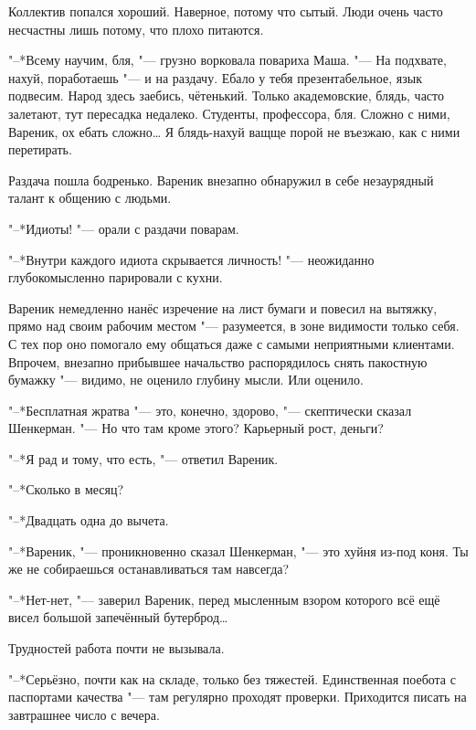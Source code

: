 \asterism

\label{Fri_2012_04_27}

Коллектив попался хороший.
Наверное, потому что сытый.
Люди очень часто несчастны лишь потому, что плохо питаются.

"--*Всему научим, бля, "--- грузно ворковала повариха Маша.
"--- На подхвате, нахуй, поработаешь "--- и на раздачу.
Ебало у тебя презентабельное, язык подвесим.
Народ здесь заебись, чётенький.
Только академовские, блядь, часто залетают, тут пересадка недалеко.
Студенты, профессора, бля.
Сложно с ними, Вареник, ох ебать сложно\dots{}
Я блядь-нахуй ващще порой не въезжаю, как с ними перетирать.

Раздача пошла бодренько.
Вареник внезапно обнаружил в себе незаурядный талант к общению с людьми.

"--*Идиоты! "--- орали с раздачи поварам.

"--*Внутри каждого идиота скрывается личность! "--- неожиданно глубокомысленно парировали с кухни.

Вареник немедленно нанёс изречение на лист бумаги и повесил на вытяжку, прямо над своим рабочим местом "--- разумеется, в зоне видимости только себя.
С тех пор оно помогало ему общаться даже с самыми неприятными клиентами.
Впрочем, внезапно прибывшее начальство распорядилось снять пакостную бумажку "--- видимо, не оценило глубину мысли.
Или оценило.

\asterism

\textspace

\label{Sun_2012_04_29}

"--*Бесплатная жратва "--- это, конечно, здорово, "--- скептически сказал Шенкерман.
"--- Но что там кроме этого?
Карьерный рост, деньги?

"--*Я рад и тому, что есть, "--- ответил Вареник.

"--*Сколько в месяц?

"--*Двадцать одна до вычета.

"--*Вареник, "--- проникновенно сказал Шенкерман, "--- это хуйня из-под коня.
Ты же не собираешься останавливаться там навсегда?

"--*Нет-нет, "--- заверил Вареник, перед мысленным взором которого всё ещё висел большой запечённый бутерброд\dots{}

Трудностей работа почти не вызывала.

"--*Серьёзно, почти как на складе, только без тяжестей.
Единственная поебота с паспортами качества "--- там регулярно проходят проверки.
Приходится писать на завтрашнее число с вечера.

